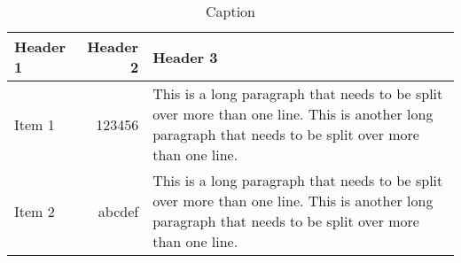 \begin{table}
    \centering
    \caption{Caption}
    \label{tab:SetWidth}
    \begin{tabularx}{\columnwidth}{lrX} \toprule
         Header 1 & Header 2 & Header 3 \\ \midrule
         Item 1 & 123456 & This is a long paragraph that needs to be split over more than one line. This is another long paragraph that needs to be split over more than one line.\\
         Item 2 & abcdef &  This is a long paragraph that needs to be split over more than one line. This is another long paragraph that needs to be split over more than one line.\\ \bottomrule
    \end{tabularx}
\end{table}